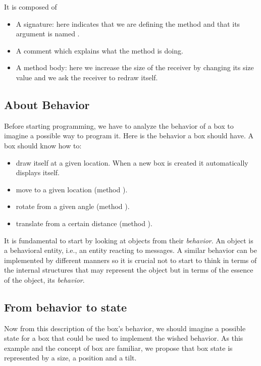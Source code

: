 \documentclass[10pt,twoside,english]{_support/latex/sbabook/sbabook}
\begin{document}
It is composed of

\begin{itemize}
\item A signature: here  indicates that we are defining the method  and that its argument is named .
\item A comment  which explains what the method is doing. 
\item A method body: here we increase the size of the receiver by changing its size value and we ask the receiver to redraw itself.
\end{itemize}
\subsection{About Behavior}
Before starting programming, we have to analyze the behavior of a box  to imagine a possible way to program it. Here is the 
behavior a box should have. A box should know how to:

\begin{itemize}
\item draw itself at a given location. When a new box is created it automatically displays itself. 
\item move to a given location (method ).
\item rotate from a given angle (method ).
\item translate from a certain distance (method ).
\end{itemize}

It is fundamental to start by looking at objects from their \textit{behavior}.  An object is a behavioral entity, i.e., an entity reacting to messages.  A similar behavior can be implemented by different manners so it is crucial not to start to think in terms of the internal structures that may represent the object but in
terms of the essence of the object, its \textit{behavior}.  
\subsection{From behavior to state}
Now from this description of the box's behavior, we should imagine a possible state for a box that could be used to implement the wished behavior.  As this example and the concept of box are familiar, we propose that box state is represented by a size, a position and a tilt.
\end{document}
